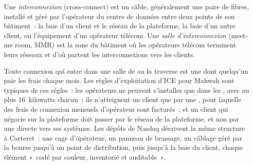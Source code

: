 \begin{definition}\label{def:nw:colocation-products-and-how-they-are-sold:mmr}
Une \emph{interconnexion} (cross-connect) est un câble, généralement une paire de fibres, installé et géré par l'opérateur du centre de données entre
deux points de son bâtiment~: la baie d'un client et le réseau de la plateforme, la baie d'un autre client, ou l'équipement d'un opérateur télécom. Une
\emph{salle d'interconnexion} (meet-me room, MMR) est la zone du bâtiment où les opérateurs télécom terminent leurs réseaux et d'où
partent les interconnexions vers les clients.
\end{definition}

Toute connexion qui entre dans une salle de  ou la traverse est une  dont quelqu'un paie les frais chaque mois. Les règles d'exploitation d'ICE pour
Mahwah sont typiques de ces règles~: les opérateurs ne peuvent s'installer que dans les , avec au plus 16~kilowatts chacun~; ils n'atteignent un client que
par une , pour laquelle des frais de connexion mensuels d'opérateur sont facturés~; et un client qui négocie sur la plateforme doit passer par le
réseau de la plateforme, et non par une  directe vers ses systèmes. Les dépôts de Nasdaq décrivent la même structure à Carteret~: une cage d'opérateur, un
panneau de brassage, un câblage géré par la bourse jusqu'à un point de distribution, puis jusqu'à la baie du client, chaque élément «~codé par couleur, inventorié et
auditable~».

